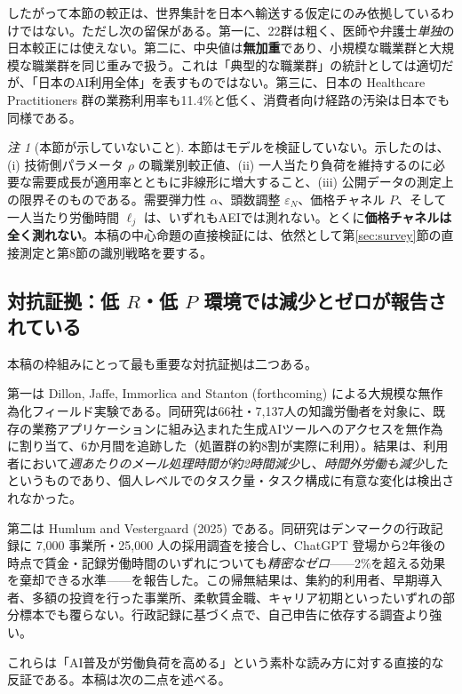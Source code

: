 \documentclass[11pt]{article}
\theoremstyle{plain}
\theoremstyle{definition}
\theoremstyle{remark}
\newtheorem*{rmk}{注}
\begin{document}
したがって本節の較正は、世界集計を日本へ輸送する仮定にのみ依拠しているわけではない。ただし次の留保がある。第一に、22群は粗く、医師や弁護士\emph{単独}の日本較正には使えない。第二に、中央値は\textbf{無加重}であり、小規模な職業群と大規模な職業群を同じ重みで扱う。これは「典型的な職業群」の統計としては適切だが、「日本のAI利用全体」を表すものではない。第三に、日本の Healthcare Practitioners 群の業務利用率も11.4\%と低く、消費者向け経路の汚染は日本でも同様である。

\begin{rmk}[本節が示していないこと]
本節はモデルを検証していない。示したのは、(i) 技術側パラメータ $\rho$ の職業別較正値、(ii) 一人当たり負荷を維持するのに必要な需要成長が適用率とともに非線形に増大すること、(iii) 公開データの測定上の限界そのものである。需要弾力性 $\alpha$、頭数調整 $\varepsilon_N$、価格チャネル $P$、そして一人当たり労働時間 $\ell_j$ は、いずれもAEIでは測れない。とくに\textbf{価格チャネルは全く測れない}。本稿の中心命題の直接検証には、依然として第\ref{sec:survey}節の直接測定と第8節の識別戦略を要する。
\end{rmk}

\subsection{対抗証拠：低 $R$・低 $P$ 環境では減少とゼロが報告されている}\label{sec:counter}
本稿の枠組みにとって最も重要な対抗証拠は二つある。

第一は Dillon, Jaffe, Immorlica and Stanton (forthcoming) による大規模な無作為化フィールド実験である。同研究は66社・7{,}137人の知識労働者を対象に、既存の業務アプリケーションに組み込まれた生成AIツールへのアクセスを無作為に割り当て、6か月間を追跡した（処置群の約8割が実際に利用）。結果は、利用者において\emph{週あたりのメール処理時間が約2時間減少}し、\emph{時間外労働も減少}したというものであり、個人レベルでのタスク量・タスク構成に有意な変化は検出されなかった。

第二は Humlum and Vestergaard (2025) である。同研究はデンマークの行政記録に 7{,}000 事業所・25{,}000 人の採用調査を接合し、ChatGPT 登場から2年後の時点で賃金・記録労働時間のいずれについても\emph{精密なゼロ}——2\%を超える効果を棄却できる水準——を報告した。この帰無結果は、集約的利用者、早期導入者、多額の投資を行った事業所、柔軟賃金職、キャリア初期といったいずれの部分標本でも覆らない。行政記録に基づく点で、自己申告に依存する調査より強い。

これらは「AI普及が労働負荷を高める」という素朴な読み方に対する直接的な反証である。本稿は次の二点を述べる。
\end{document}
